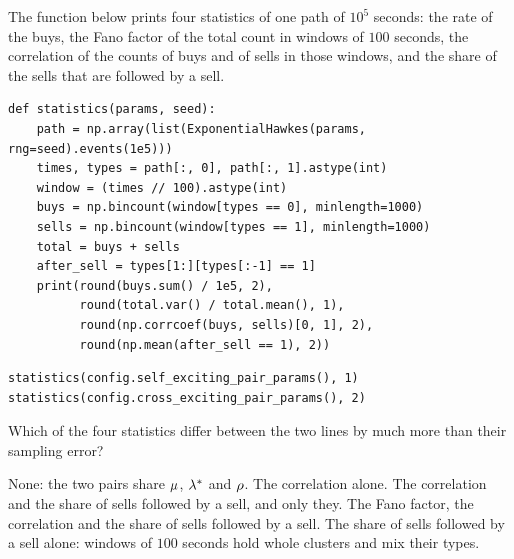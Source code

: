 \begin{question}
\label{question.statisticsThatTellSelfFromCross}
The function below prints four statistics of one path of $10^{5}$ seconds:
the rate of the buys,
the Fano factor of the total count in windows of $100$ seconds,
the correlation of the counts of buys and of sells in those windows,
and the share of the sells that are followed by a sell.
\begin{lstlisting}[caption={Four statistics of one path}, label=listing.statisticsThatTellSelfFromCrossStatistics]
def statistics(params, seed):
    path = np.array(list(ExponentialHawkes(params, rng=seed).events(1e5)))
    times, types = path[:, 0], path[:, 1].astype(int)
    window = (times // 100).astype(int)
    buys = np.bincount(window[types == 0], minlength=1000)
    sells = np.bincount(window[types == 1], minlength=1000)
    total = buys + sells
    after_sell = types[1:][types[:-1] == 1]
    print(round(buys.sum() / 1e5, 2),
          round(total.var() / total.mean(), 1),
          round(np.corrcoef(buys, sells)[0, 1], 2),
          round(np.mean(after_sell == 1), 2))
\end{lstlisting}
\begin{lstlisting}[caption={The self- and the cross-exciting pair}, label=listing.statisticsThatTellSelfFromCrossRun]
statistics(config.self_exciting_pair_params(), 1)
statistics(config.cross_exciting_pair_params(), 2)
\end{lstlisting}
Which of the four statistics differ between the two lines
by much more than their sampling error?
\begin{choices}
 \choice None: the two pairs share $\mu$, $\lambda_{ }^{*}$ and $\rho$.
 \choice The correlation alone.
 \correctchoice The correlation and the share of sells followed by a sell, and only they.
 \choice The Fano factor, the correlation and the share of sells followed by a sell.
 \choice The share of sells followed by a sell alone:
  windows of $100$ seconds hold whole clusters and mix their types.
\end{choices}
\end{question}

